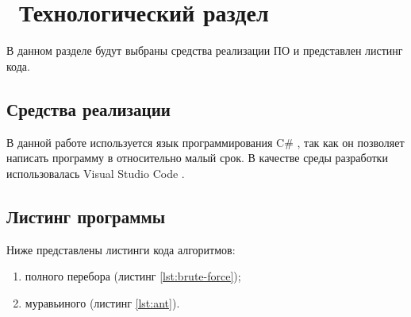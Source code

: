 \chapter{ Технологический раздел}
\label{cha:technological}

    В данном разделе будут выбраны средства реализации ПО и представлен листинг кода. 

    \section{Средства реализации}
        В данной работе используется язык программирования C\# \cite{python}, так как
        он позволяет написать программу в относительно малый срок.
        В качестве среды разработки использовалась Visual Studio Code \cite{visual-studio-code}. 


    \section{Листинг программы}
        Ниже представлены листинги кода алгоритмов:
        \begin{enumerate}
            \item полного перебора (листинг \ref{lst:brute-force});
            \item муравьиного (листинг \ref{lst:ant}).
        \end{enumerate}
        
